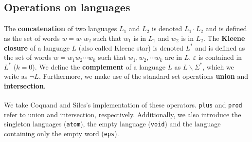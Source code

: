     \subsection{Operations on languages}

    \paragraph{}

    The \textbf{concatenation} of two languages $L_1$ and $L_2$ is denoted $L_1 \cdot L_2$ and is defined as the set of words $w = w_1 w_2$ such that $w_1$ is in $L_1$ and $w_2$ is in $L_2$.
    The \textbf{Kleene closure} of a language $L$ (also called Kleene star) is denoted $L^*$ and is defined as the set of words $w = w_1 w_2 \cdots w_k$ such that $w_1, w_2, \cdots w_k$ are in $L$. $\varepsilon$ is contained in $L^*$ ($k=0$).
    We define the \textbf{complement} of a language $L$ as $L \backslash \Sigma^*$, which we write as $\neg L$.
    Furthermore, we make use of the standard set operations \textbf{union} and \textbf{intersection}.

    \paragraph{}
    We take Coquand and Siles's \cite{DBLP:conf/cpp/CoquandS11} implementation of these operators. 
    \lstinline{plus} and \lstinline{prod} refer to union and intersection, respectively. 
    Additionally, we also introduce the singleton languages (\lstinline{atom}), the empty language (\lstinline{void}) and the language containing only the empty word (\lstinline{eps}).



